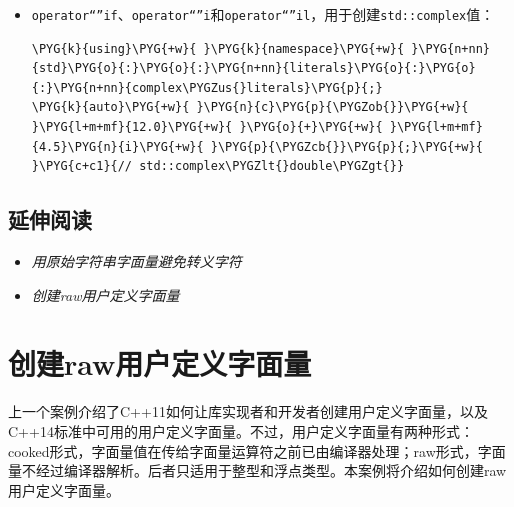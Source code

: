 \begin{itemize}

\item \texttt{operator“”if}、\texttt{operator“”i}和\texttt{operator“”il}，用于创建\texttt{std::\allowbreak{}complex}值：



\begin{codeblockbg}
\begin{Verbatim}[commandchars=\\\{\},breaklines=true,breakanywhere=true,fontsize=\codefont,xleftmargin=17bp]
\PYG{k}{using}\PYG{+w}{ }\PYG{k}{namespace}\PYG{+w}{ }\PYG{n+nn}{std}\PYG{o}{:}\PYG{o}{:}\PYG{n+nn}{literals}\PYG{o}{:}\PYG{o}{:}\PYG{n+nn}{complex\PYGZus{}literals}\PYG{p}{;}
\PYG{k}{auto}\PYG{+w}{ }\PYG{n}{c}\PYG{p}{\PYGZob{}}\PYG{+w}{ }\PYG{l+m+mf}{12.0}\PYG{+w}{ }\PYG{o}{+}\PYG{+w}{ }\PYG{l+m+mf}{4.5}\PYG{n}{i}\PYG{+w}{ }\PYG{p}{\PYGZcb{}}\PYG{p}{;}\PYG{+w}{ }\PYG{c+c1}{// std::complex\PYGZlt{}double\PYGZgt{}}
\end{Verbatim}
\end{codeblockbg}

\end{itemize}



\subsection{延伸阅读}



\begin{itemize}
\item \textit{用原始字符串字面量避免转义字符}



\item \textit{创建raw用户定义字面量}

\end{itemize}



\section{创建raw用户定义字面量}



上一个案例介绍了C++11如何让库实现者和开发者创建用户定义字面量，以及C++14标准中可用的用户定义字面量。不过，用户定义字面量有两种形式：cooked形式，字面量值在传给字面量运算符之前已由编译器处理；raw形式，字面量不经过编译器解析。后者只适用于整型和浮点类型。本案例将介绍如何创建raw用户定义字面量。


